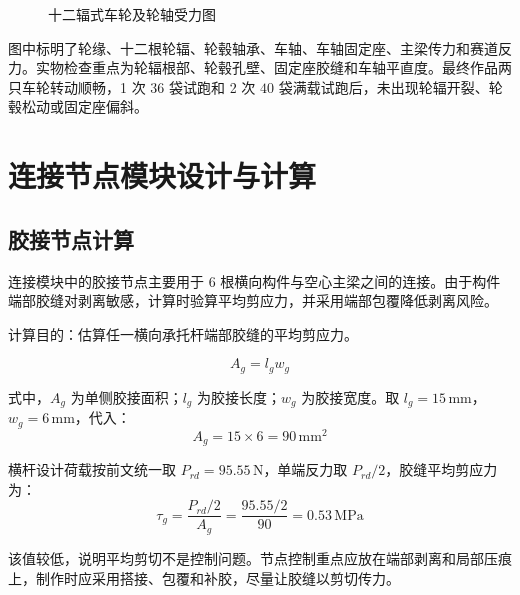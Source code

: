 \documentclass[UTF8,a4paper,12pt,fontset=none]{ctexart}
\numberwithin{equation}{section}
\numberwithin{figure}{section}
\numberwithin{table}{section}
\newcommand{\mm}{\,\mathrm{mm}}
\newcommand{\Nunit}{\,\mathrm{N}}
\newcommand{\MPa}{\,\mathrm{MPa}}
\begin{document}
\begin{figure}[H]
\caption{十二辐式车轮及轮轴受力图}
\label{fig:midas-wheel-force}
\end{figure}

图中标明了轮缘、十二根轮辐、轮毂轴承、车轴、车轴固定座、主梁传力和赛道反力。实物检查重点为轮辐根部、轮毂孔壁、固定座胶缝和车轴平直度。最终作品两只车轮转动顺畅，1 次 $36$ 袋试跑和 2 次 $40$ 袋满载试跑后，未出现轮辐开裂、轮毂松动或固定座偏斜。

\newpage
\section{连接节点模块设计与计算}

\subsection{胶接节点计算}
连接模块中的胶接节点主要用于 6 根横向构件与空心主梁之间的连接。由于构件端部胶缝对剥离敏感，计算时验算平均剪应力，并采用端部包覆降低剥离风险。

计算目的：估算任一横向承托杆端部胶缝的平均剪应力。

\begin{equation}
  A_g=l_gw_g
\end{equation}

式中，$A_g$ 为单侧胶接面积；$l_g$ 为胶接长度；$w_g$ 为胶接宽度。取 $l_g=15\mm$，$w_g=6\mm$，代入：
\begin{equation}
  A_g=15\times6=90\mm^2
\end{equation}

横杆设计荷载按前文统一取 $P_{rd}=95.55\Nunit$，单端反力取 $P_{rd}/2$，胶缝平均剪应力为：
\begin{equation}
  \tau_g=\frac{P_{rd}/2}{A_g}=\frac{95.55/2}{90}=0.53\MPa
\end{equation}

该值较低，说明平均剪切不是控制问题。节点控制重点应放在端部剥离和局部压痕上，制作时应采用搭接、包覆和补胶，尽量让胶缝以剪切传力。
\end{document}
